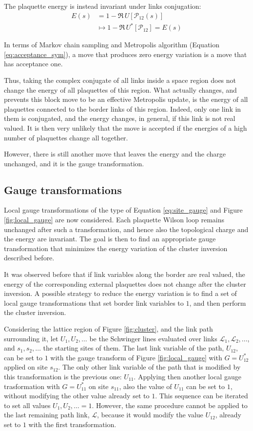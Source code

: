 The plaquette energy is instead invariant under links conjugation:
\[\begin{aligned}
    E(s) &= 1-\Re\,U[\mathcal P_{12}(s)] \\
         &\mapsto 1-\Re\,U^*[\mathcal P_{12}] = E(s)
\end{aligned}\]

In terms of Markov chain sampling and Metropolis algorithm (Equation \ref{eq:acceptance_sym}),
a move that produces zero energy variation is a move that has acceptance one.

Thus, taking the complex conjugate of all links inside a space region does not change the energy of all plaquettes of this region.
What actually changes, and prevents this block move to be an effective Metropolis update,
is the energy of all plaquettes connected to the border links of this region.
Indeed, only one link in them is conjugated, and the energy changes, in general, if this link is not real valued.
It is then very unlikely that the move is accepted if the energies of a high number of plaquettes change all together.

However, there is still another move that leaves the energy and the charge unchanged,
and it is the gauge transformation.

\subsection*{Gauge transformations}
Local gauge transformations of the type of Equation \eqref{eq:site_gauge} and Figure \ref{fig:local_gauge} are now considered.
Each plaquette Wilson loop remains unchanged after such a transformation,
and hence also the topological charge and the energy are invariant.
The goal is then to find an appropriate gauge transformation that minimizes the energy variation of the cluster inversion described before.

It was observed before that if link variables along the border are real valued,
the energy of the corresponding external plaquettes does not change after the cluster inversion.
A possible strategy to reduce the energy variation is to find a set of local gauge transformations that set border link variables to $1$,
and then perform the cluster inversion.

Considering the lattice region of Figure \ref{fig:cluster}, and the link path surrounding it,
let $U_1, U_2, \ldots$ be the Schwinger lines evaluated over links $\mathcal L_1, \mathcal L_2, \ldots$,
and $s_1, s_2, \ldots$ the starting sites of them.
The last link variable of the path, $U_{12}$, can be set to $1$ with the gauge transform of Figure \ref{fig:local_gauge}
with $G=U^*_{12}$ applied on site $s_{12}$.
The only other link variable of the path that is modified by this transformation is the previous one: $U_{11}$.
Applying then another local gauge trasformation with $G=U^*_{11}$ on site $s_{11}$,
also the value of $U_{11}$ can be set to $1$, without modifying the other value already set to $1$.
This sequence can be iterated to set all values $U_1,U_2,\ldots=1$.
However, the same procedure cannot be applied to the last remaining path link, $\mathcal L$,
because it would modify the value $U_{12}$, already set to $1$ with the first transformation.

